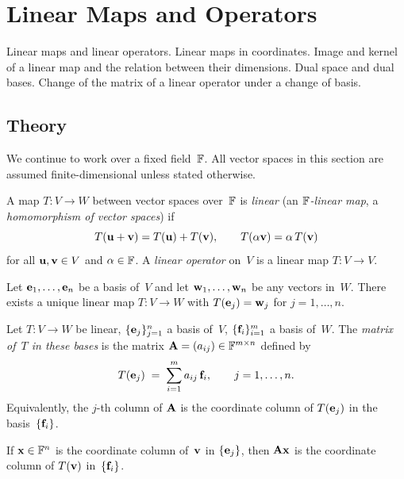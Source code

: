 
\section{Linear Maps and Operators}
\label{sec:1.1.05-linear-maps}

\begin{ticket}
Linear maps and linear operators. Linear maps in coordinates. Image and kernel of a linear map and the relation between their dimensions. Dual space and dual bases. Change of the matrix of a linear operator under a change of basis.
\end{ticket}

\subsection*{Theory}

We continue to work over a fixed field~$\mathbb{F}$. All vector spaces in this
section are assumed finite-dimensional unless stated otherwise.

\begin{definition}
\label{def:linear-map}
A map $T \colon V \to W$ between vector spaces over~$\mathbb{F}$ is
\emph{linear} (an \emph{$\mathbb{F}$-linear map}, a \emph{homomorphism of vector
spaces}) if
\[
  T(\mathbf{u} + \mathbf{v}) = T(\mathbf{u}) + T(\mathbf{v}), \qquad
  T(\alpha \mathbf{v}) = \alpha\, T(\mathbf{v})
\]
for all $\mathbf{u}, \mathbf{v} \in V$ and $\alpha \in \mathbb{F}$. A \emph{linear
operator} on~$V$ is a linear map $T \colon V \to V$.
\end{definition}

\begin{theorem}
\label{thm:lin-determined-by-basis}
Let $\mathbf{e}_1, \dots, \mathbf{e}_n$ be a basis of~$V$ and let
$\mathbf{w}_1, \dots, \mathbf{w}_n$ be any vectors in~$W$. There exists a
unique linear map $T \colon V \to W$ with $T(\mathbf{e}_j) = \mathbf{w}_j$
for $j = 1, \dots, n$.
\end{theorem}

\begin{definition}
\label{def:matrix-of-linear-map}
Let $T \colon V \to W$ be linear, $\{\mathbf{e}_j\}_{j=1}^{n}$ a basis
of~$V$, $\{\mathbf{f}_i\}_{i=1}^{m}$ a basis of~$W$. The
\emph{matrix of~$T$ in these bases} is the matrix
$\mathbf{A} = (a_{ij}) \in \mathbb{F}^{m \times n}$ defined by
\[
  T(\mathbf{e}_j) \;=\; \sum_{i=1}^{m} a_{ij}\,\mathbf{f}_i,
  \qquad j = 1, \dots, n.
\]
Equivalently, the $j$-th column of $\mathbf{A}$ is the coordinate column
of $T(\mathbf{e}_j)$ in the basis~$\{\mathbf{f}_i\}$.

If $\mathbf{x} \in \mathbb{F}^n$ is the coordinate column of~$\mathbf{v}$ in
$\{\mathbf{e}_j\}$, then $\mathbf{A}\mathbf{x}$ is the coordinate column of
$T(\mathbf{v})$ in~$\{\mathbf{f}_i\}$.
\end{definition}

